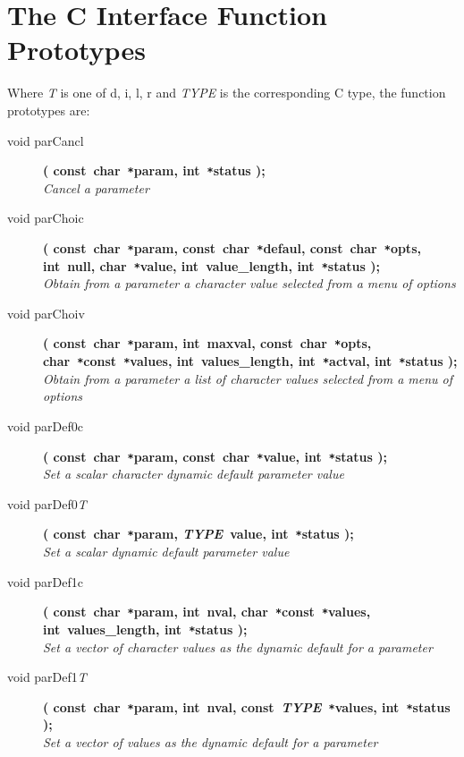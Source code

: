 \documentclass[twoside,11pt]{article}
\newcommand{\xlabel}[1]{}
\begin{document}
\section{\xlabel{c_interface_function_prototypes}The C Interface Function Prototypes}
Where \textit{T} is one of d, i, l, r and \textit{TYPE} is the corresponding C 
type, the function prototypes are:
\begin{flushleft}
\begin{description}
\item[void parCancl] 
\textbf{( const~char~\texttt{*}param, int~\texttt{*}status );}\\
\textit{Cancel a parameter}
\item[void parChoic]
\textbf{( const~char~\texttt{*}param, const~char~\texttt{*}defaul,
               const~char~\texttt{*}opts, int~null, char~\texttt{*}value,
               int~value\_length, int~\texttt{*}status );} \\
\textit{Obtain from a parameter a character value selected from a menu
            of options}
\item[void parChoiv]
\textbf{( const~char~\texttt{*}param, int~maxval, const~char~\texttt{*}opts, 
               char~\texttt{*}const~\texttt{*}values, int~values\_length,
               int~\texttt{*}actval, int~\texttt{*}status );} \\
\textit{Obtain from a parameter a list of character values selected from
            a menu of options}
\item[void parDef0c]
\textbf{( const~char~\texttt{*}param, const~char~\texttt{*}value,
          int~\texttt{*}status );}\\
\textit{Set a scalar character dynamic default parameter value}
\item[void parDef0\textit{T}]
\textbf{( const~char~\texttt{*}param, \textit{TYPE}~value,
          int~\texttt{*}status );}\\
\textit{Set a scalar dynamic default parameter value}
\item[void parDef1c]
\textbf{( const~char~\texttt{*}param, int~nval,
          char~\texttt{*}const~\texttt{*}values, int~values\_length,
          int~\texttt{*}status );} \\
\textit{Set a vector of character values as the dynamic default for a parameter}
\item[void parDef1\textit{T}]
\textbf{( const~char~\texttt{*}param, int~nval,
          const~\textit{TYPE}~\texttt{*}values, int~\texttt{*}status );}\\
\textit{Set a vector of values as the dynamic default for a parameter}

\end{description}
\end{flushleft}
\end{document}
